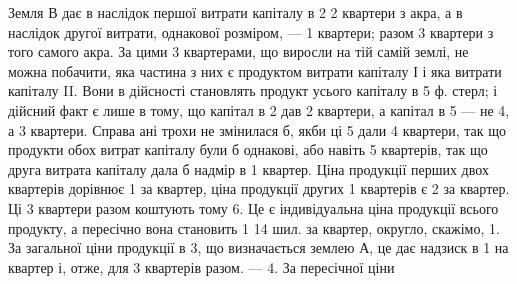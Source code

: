 
Земля $В$ дає в наслідок першої витрати капіталу в 2 2 квартери
з акра, а в наслідок другої витрати, однакової розміром, — 1 квартери; разом
3 квартери з того самого акра. За цими 3 квартерами, що виросли
на тій самій землі, не можна побачити, яка частина з них є продуктом витрати
капіталу І і яка витрати капіталу II. Вони в дійсності становлять продукт
усього капіталу в 5 ф. стерл; і дійсний факт є лише в тому, що капітал
в 2 дав 2 квартери, а капітал в 5 — не 4, а 3 квартери.
Справа ані трохи не змінилася б, якби ці 5 дали 4 квартери, так що
продукти обох витрат капіталу були б однакові, або навіть 5 квартерів, так
що друга витрата капіталу дала б надмір в 1 квартер. Ціна продукції перших
двох квартерів дорівнює 1 за квартер, ціна продукції других 1 квартерів є 2 за квартер. Ці 3 квартери разом коштують тому 6.
Це є індивідуальна ціна продукції всього продукту, а пересічно вона становить
1 14 шил. за квартер, округло, скажімо, 1. За загальної ціни
продукції в 3, що визначається землею $А$, це дає надзиск в 1
на квартер і, отже, для 3 квартерів разом. — 4. За пересічної ціни
\parbreak{}  %

